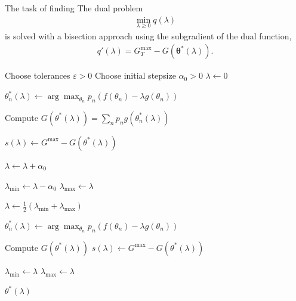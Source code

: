 \documentclass{article}
\begin{document}
The task of finding The dual problem
\begin{align}
    \min_{\lambda \ge 0} q(\lambda)
\end{align}
is solved with a bisection approach using the subgradient of the dual function,
\begin{align}
q'(\lambda) = G_T^{\max} - G(\boldsymbol{\theta}^*(\lambda)).
\end{align}

\begin{algorithm}
    \caption{Dual Minimization with Expansion + Bisection}
    \begin{algorithmic}[1]

        \State Choose tolerances $\varepsilon > 0$
        \State Choose initial stepsize $\alpha_0 > 0$
        \State $\lambda \gets 0$

        \Repeat
                \State
                $\displaystyle
                \theta_n^*(\lambda)
                \gets
                \arg\max_{\theta_n}
                p_n \left(
                f(\theta_n)
                - \lambda g(\theta_n)
                \right)
                $
            \EndFor

            \State Compute 
            $\displaystyle
            G(\theta^*(\lambda))
            =
            \sum_n p_n g(\theta_n^*(\lambda))
            $

            \State $s(\lambda) \gets G^{\max} - G(\theta^*(\lambda))$

                \State $\lambda \gets \lambda + \alpha_0$
            \EndIf

        \State $\lambda_{\min} \gets \lambda - \alpha_0$
        \State $\lambda_{\max} \gets \lambda$

        \While{$\lambda_{\max} - \lambda_{\min} > \varepsilon$}
            \State $\lambda \gets \frac{1}{2}(\lambda_{\min} + \lambda_{\max})$

                \State
                $\displaystyle
                \theta_n^*(\lambda)
                \gets
                \arg\max_{\theta_n}
                p_n \left(
                f(\theta_n)
                - \lambda g(\theta_n)
                \right)
                $
            \EndFor

            \State Compute $G(\theta^*(\lambda))$
            \State $s(\lambda) \gets G^{\max} - G(\theta^*(\lambda))$

                \State $\lambda_{\min} \gets \lambda$
            \Else
                \State $\lambda_{\max} \gets \lambda$
            \EndIf
        \EndWhile

        \State \Return $\theta^*(\lambda)$

    \end{algorithmic}
\end{algorithm}
\end{document}

